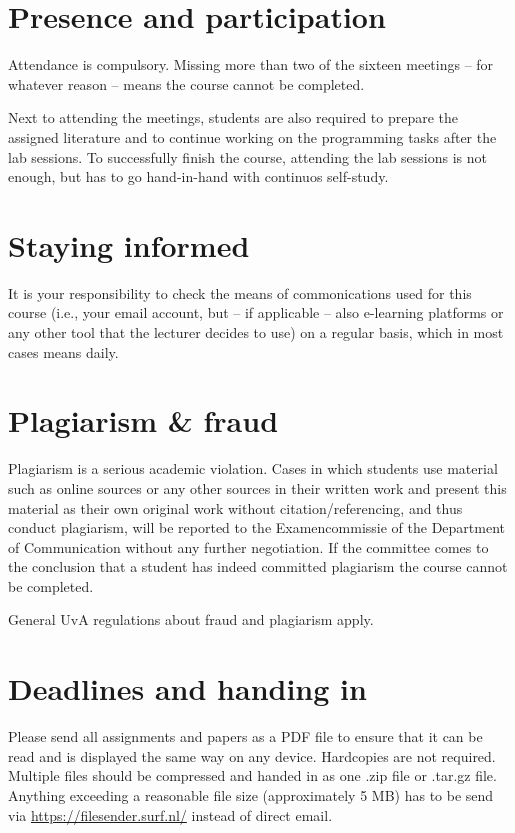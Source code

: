 \documentclass[a4paper,10pt]{report}
\begin{document}
\section{Presence and participation}
Attendance is compulsory. Missing more than two of the sixteen meetings – for whatever reason – means the course cannot be completed.

Next to attending the meetings, students are also required to prepare the assigned literature and to continue working on the programming tasks after the lab sessions. To successfully finish the course, attending the lab sessions is not enough, but has to go hand-in-hand with continuos self-study.

\section{Staying informed}
It is your responsibility to check the means of commonications used for this course (i.e., your email account, but – if applicable – also e-learning platforms or any other tool that the lecturer decides to use) on a regular basis, which in most cases means daily.

\section{Plagiarism \& fraud}
Plagiarism is a serious academic violation. Cases in which students use material such as online sources or any other sources in their written work and present this material as their own original work without citation/referencing, and thus conduct plagiarism, will be reported to the Examencommissie of the Department of Communication without any further negotiation. If the committee comes to the conclusion that a student has indeed committed plagiarism the course cannot be completed. %

General UvA regulations about fraud and plagiarism apply.

\section{Deadlines and handing in}
Please send all assignments and papers as a PDF file to ensure that it can be read and is displayed the same way on any device. Hardcopies are not required. Multiple files should be compressed and handed in as one .zip file or .tar.gz file. Anything exceeding a reasonable file size (approximately 5 MB) has to be send via \url{https://filesender.surf.nl/} instead of direct email.
\end{document}
